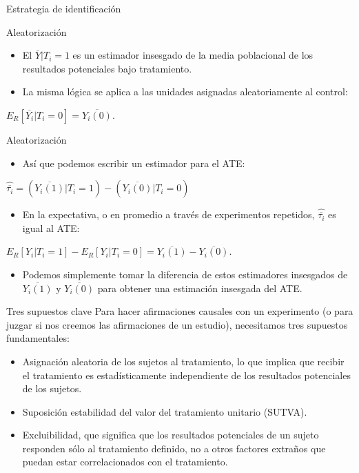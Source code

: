 \documentclass[
  ignorenonframetext,
]{beamer}
\providecommand{\tightlist}{%
  \setlength{\itemsep}{0pt}\setlength{\parskip}{0pt}}
\begin{document}
\begin{frame}{Estrategia de identificación}
\begin{frame}{Aleatorización}
\begin{itemize}
\item
  El \(\overline{Y}|T_i=1\) es un estimador insesgado de la media
  poblacional de los resultados potenciales bajo tratamiento.
\item
  La misma lógica se aplica a las unidades asignadas aleatoriamente al
  control:
\end{itemize}

\centering

\(E_R[\overline{Y_i}|T_i=0]=\overline{Y_i(0)}\).
\end{frame}

\begin{frame}{Aleatorización}
\protect\hypertarget{aleatorizaciuxf3n-2}{}
\begin{itemize}
\tightlist
\item
  Así que podemos escribir un estimador para el ATE:
\end{itemize}

\centering

\(\hat{\overline{\tau_i}} = ( \overline{Y_i(1)} | T_i = 1 ) - ( \overline{Y_i(0)} | T_i = 0 )\)

\begin{itemize}
\tightlist
\item
  En la expectativa, o en promedio a través de experimentos repetidos,
  \(\hat{\overline{\tau_i}}\) es igual al ATE:
\end{itemize}

\centering

\(E_R[Y_i| T_i = 1 ] - E_R[Y_i | T_i = 0] = \overline{Y_i(1)} - \overline{Y_i(0)}\).

\begin{itemize}
\tightlist
\item
  Podemos simplemente tomar la diferencia de estos estimadores
  insesgados de \(\overline{Y_i(1)}\) y \(\overline{Y_i(0)}\) para
  obtener una estimación insesgada del ATE.
\end{itemize}
\end{frame}

\begin{frame}{Tres supuestos clave}
\protect\hypertarget{tres-supuestos-clave}{}
Para hacer afirmaciones causales con un experimento (o para juzgar si
nos creemos las afirmaciones de un estudio), necesitamos tres supuestos
fundamentales:

\begin{itemize}
\item
  Asignación aleatoria de los sujetos al tratamiento, lo que implica que
  recibir el tratamiento es estadísticamente independiente de los
  resultados potenciales de los sujetos.
\item
  Suposición estabilidad del valor del tratamiento unitario (SUTVA).
\item
  Excluibilidad, que significa que los resultados potenciales de un
  sujeto responden sólo al tratamiento definido, no a otros factores
  extraños que puedan estar correlacionados con el tratamiento.
\end{itemize}
\end{frame}


\end{frame}
\end{document}
